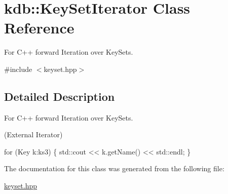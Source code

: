 \hypertarget{classkdb_1_1KeySetIterator}{}\section{kdb\+:\+:Key\+Set\+Iterator Class Reference}
\label{classkdb_1_1KeySetIterator}


For C++ forward Iteration over Key\+Sets.  




{\ttfamily \#include $<$keyset.\+hpp$>$}



\subsection{Detailed Description}
For C++ forward Iteration over Key\+Sets. 

(External Iterator) 
\begin{DoxyCode}
\textcolor{keywordflow}{for} (Key k:ks3)
\{
   std::cout << k.getName() << std::endl;
\}
\end{DoxyCode}
 

The documentation for this class was generated from the following file\+:\begin{DoxyCompactItemize}
\item 
\hyperlink{keyset_8hpp}{keyset.\+hpp}\end{DoxyCompactItemize}
